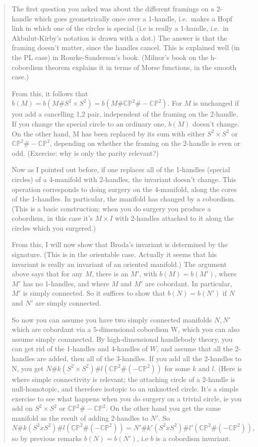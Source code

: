 \documentclass{article}
\begin{document}
\begin{quote}
The first question you asked was about the different framings on a
2-handle which goes geometrically once over a 1-handle, i.e.~makes a
Hopf link in which one of the circles is special (i.e is really a
1-handle, i.e.~in Akbulut-Kirby's notation is drawn with a dot.) The
answer is that the framing doesn't matter, since the handles cancel.
This is explained well (in the PL case) in Rourke-Sanderson's book.
(Milnor's book on the h-cobordism theorem explains it in terms of Morse
functions, in the smooth case.)

From this, it follows that
\(b(M) = b(M\#S^2 \times S^2) = b(M\#\mathbb{CP}^2\#-\mathbb{CP}^2)\).
For \(M\) is unchanged if you add a cancelling 1,2 pair, independent of
the framing on the 2-handle. If you change the special circle to an
ordinary one, \(b(M)\) doesn't change. On the other hand, M has been
replaced by its sum with either \(S^2 \times S^2\) or
\(\mathbb{CP}^2 \# -\mathbb{CP}^2\), depending on whether the framing on
the 2-handle is even or odd. (Exercise: why is only the parity
relevant?)

Now as I pointed out before, if one replaces all of the 1-handles
(special circles) of a 4-manifold with 2-handles, the invariant doesn't
change. This operation corresponds to doing surgery on the 4-manifold,
along the cores of the 1-handles. In particular, the manifold has
changed by a cobordism. (This is a basic construction; when you do
surgery you produce a cobordism, in this case it's \(M \times I\) with
2-handles attached to it along the circles which you surgered.)

From this, I will now show that Broda's invariant is determined by the
signature. (This is in the orientable case. Actually it seems that his
invariant is really an invariant of an oriented manifold.) The argument
above says that for any \(M\), there is an \(M'\), with
\(b(M) = b(M')\), where \(M'\) has no 1-handles, and where \(M\) and
\(M'\) are cobordant. In particular, \(M'\) is simply connected. So it
suffices to show that \(b(N) = b(N')\) if \(N\) and \(N'\) are simply
connected.

So now you can assume you have two simply connected manifolds \(N,N'\)
which are cobordant via a \(5\)-dimensional cobordism W, which you can
also assume simply connnected. By high-dimensional handlebody theory,
you can get rid of the 1-handles and 4-handles of \(W\), and assume that
all the 2-handles are added, then all of the 3-handles. If you add all
the 2-handles to N, you get
\(N\#k(S^2 \times S^2)\#l(\mathbb{CP}^2\#(-\mathbb{CP}^2))\) for some
\(k\) and \(l\). (Here is where simple connectivity is relevant; the
attaching circle of a 2-handle is null-homotopic, and therefore isotopic
to an unknotted circle. It's a simple exercise to see what happens when
you do surgery on a trivial circle, ie you add on \(S^2 \times S^2\) or
\(\mathbb{CP}^2 \# -\mathbb{CP}^2\). On the other hand you get the same
manifold as the result of adding 2-handles to \(N'\). So
\[N\#k(S^2 x S^2)\#l(\mathbb{CP}^2\#(-\mathbb{CP}^2)) = N'\#k'(S^2 x S^2)\#l'(\mathbb{CP}^2\#(-\mathbb{CP}^2)),\]
so by previous remarks \(b(N) = b(N')\), i.e \(b\) is a cobordism
invariant.


\end{quote}
\end{document}
